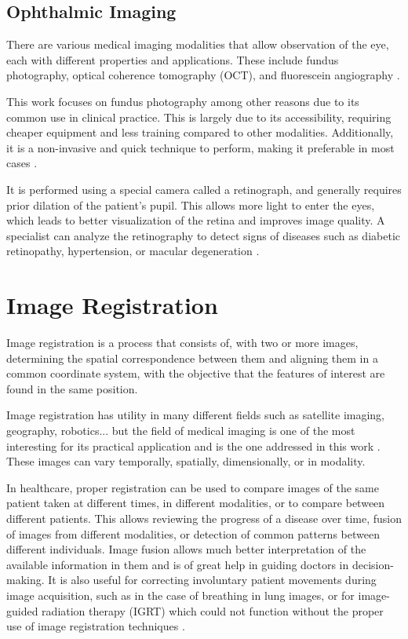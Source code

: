 \subsection{Ophthalmic Imaging}
\label{subsec:Imaxe oftalmolóxica}
There are various medical imaging modalities that allow observation of the eye, each with different properties and applications.
These include fundus photography, optical coherence tomography (OCT), and fluorescein angiography \cite{ilginis2014ophthalmic}.

This work focuses on fundus photography among other reasons due to its common use in clinical practice.
This is largely due to its accessibility, requiring cheaper equipment and less training compared to other modalities.
Additionally, it is a non-invasive and quick technique to perform, making it preferable in most cases \cite{retinimaging}.

It is performed using a special camera called a retinograph, and generally requires prior dilation of the patient's pupil.
This allows more light to enter the eyes, which leads to better visualization of the retina and improves image quality.
A specialist can analyze the retinography to detect signs of diseases such as diabetic retinopathy, hypertension, or macular degeneration \cite{retreggood}.

\section{Image Registration}
\label{sec:Rexistro de imaxes}
Image registration is a process that consists of, with two or more images, determining the spatial correspondence between them
and aligning them in a common coordinate system, with the objective that the features of interest are found in the same position.

Image registration has utility in many different fields such as satellite imaging, geography, robotics... but the
field of medical imaging is one of the most interesting for its practical application and is the one addressed in this work \cite{goshtasby2017theory}.
These images can vary temporally, spatially, dimensionally, or in modality.

In healthcare, proper registration can be used to compare images of the same patient taken at different times, in different modalities, or to compare between different patients.
This allows reviewing the progress of a disease over time, fusion of images from different modalities, or detection of common patterns between different individuals.
Image fusion allows much better interpretation of the available information in them and is of great help in guiding doctors in decision-making.
It is also useful for correcting involuntary patient movements during image acquisition, such as in the case of breathing in lung images, or for image-guided radiation therapy (\gls{IGRT}) which
could not function without the proper use of image registration techniques \cite{wang2022neuralrenderingstereo3d}.

